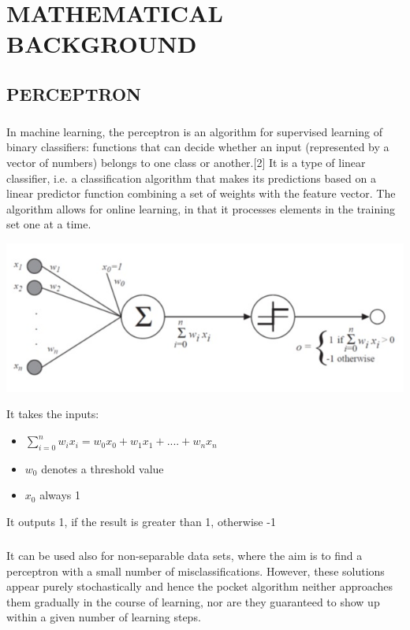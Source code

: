 \documentclass[10pt,a4paper,twoside]{report}
\begin{document}
\chapter{MATHEMATICAL BACKGROUND}

\section{PERCEPTRON}
\paragraph{ }In machine learning, the perceptron is an algorithm for supervised learning of binary classifiers: functions that can decide whether an input (represented by a vector of numbers) belongs to one class or another.[2] It is a type of linear classifier, i.e. a classification algorithm that makes its predictions based on a linear predictor function combining a set of weights with the feature vector. The algorithm allows for online learning, in that it processes elements in the training set one at a time.\\
\begin{center}
\includegraphics[scale=.75]{per.jpg}
\end{center}
It takes the inputs:
\begin{itemize}
\item $\sum_{i=0}^{n}w_ix_i =w_0x_0+w_1x_1+....+w_nx_n  $
\item $w_0$ denotes a threshold value
\item $x_0$ always 1
\end{itemize}
It outputs 1, if the result is greater than 1, otherwise -1
\paragraph{ }It can be used also for non-separable data sets, where the aim is to find a perceptron with a small number of misclassifications. However, these solutions appear purely stochastically and hence the pocket algorithm neither approaches them gradually in the course of learning, nor are they guaranteed to show up within a given number of learning steps.
\end{document}
